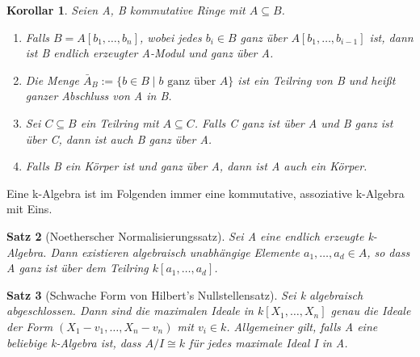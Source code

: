 \documentclass{article}
\newtheorem{satz}{Satz}
\newtheorem{korollar}[satz]{Korollar}
\begin{document}
	\begin{korollar}
	Seien A, B kommutative Ringe mit \(A \subseteq B\).
	\begin{enumerate}
	\item Falls \(B = A[b_1, \ldots, b_n]\), wobei jedes \(b_i \in B\) ganz über
	\(A[b_1, \ldots, b_{i-1}]\) ist, dann ist B endlich erzeugter A-Modul und 
	ganz über A.
	\item Die Menge \(\bar{A}_B := \{b \in B\;|\;b \text{ ganz über } A\}\) ist
	ein Teilring von B und heißt ganzer Abschluss von A in B.
	\item Sei \(C \subseteq B\) ein Teilring mit \(A \subseteq C\). Falls C
	ganz ist über A und B ganz ist über C, dann ist auch B ganz über A.
	\item Falls B ein Körper ist und ganz über A, dann ist A auch ein Körper.
	\end{enumerate}
	\end{korollar}

	Eine k-Algebra ist im Folgenden immer eine kommutative, assoziative
	k-Algebra mit Eins.

	\begin{satz}[Noetherscher Normalisierungssatz]
	Sei A eine endlich erzeugte k-Algebra. Dann existieren algebraisch
	unabhängige Elemente \(a_1, \ldots, a_d \in A\), so dass A ganz ist über
	dem Teilring \(k[a_1, \ldots, a_d]\).
	\end{satz}

	\begin{satz}[Schwache Form von Hilbert's Nullstellensatz]
	Sei k algebraisch abgeschlossen. Dann sind die maximalen Ideale in
	\(k[X_1, \ldots, X_n]\) genau die Ideale der Form \((X_1-v_1,\ldots,
	X_n-v_n)\) mit \(v_i \in k\). Allgemeiner gilt, falls A eine beliebige
	k-Algebra ist, dass \(A/I \cong k\) für jedes maximale Ideal I in A.
	\end{satz}
\end{document}
